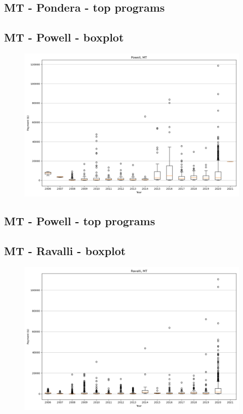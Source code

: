 \subsection*{MT - Pondera - top programs}

\newpage
\subsection*{MT - Powell - boxplot}
\begin{figure}[h]
\centering
\includegraphics[width=7in]{../output/boxplots/counties/Powell-MT_boxplot.png}
\end{figure}


\subsection*{MT - Powell - top programs}

\newpage
\subsection*{MT - Ravalli - boxplot}
\begin{figure}[h]
\centering
\includegraphics[width=7in]{../output/boxplots/counties/Ravalli-MT_boxplot.png}
\end{figure}


